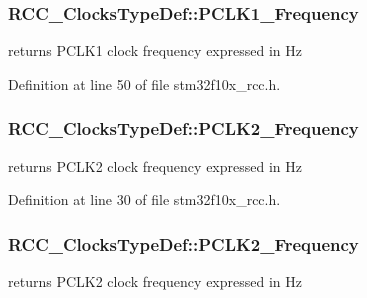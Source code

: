 \subsubsection[{\texorpdfstring{P\+C\+L\+K1\+\_\+\+Frequency}{PCLK1_Frequency}}]{ R\+C\+C\+\_\+\+Clocks\+Type\+Def\+::\+P\+C\+L\+K1\+\_\+\+Frequency}\hypertarget{struct_r_c_c___clocks_type_def_add4cfc63c35178d187107edc764e0b8f}{}\label{struct_r_c_c___clocks_type_def_add4cfc63c35178d187107edc764e0b8f}
returns P\+C\+L\+K1 clock frequency expressed in Hz 

Definition at line 50 of file stm32f10x\+\_\+rcc.\+h.

\subsubsection[{\texorpdfstring{P\+C\+L\+K2\+\_\+\+Frequency}{PCLK2_Frequency}}]{ R\+C\+C\+\_\+\+Clocks\+Type\+Def\+::\+P\+C\+L\+K2\+\_\+\+Frequency}\hypertarget{struct_r_c_c___clocks_type_def_a393ec59f4d03bc5ad678cf4f7d68b8f5}{}\label{struct_r_c_c___clocks_type_def_a393ec59f4d03bc5ad678cf4f7d68b8f5}
returns P\+C\+L\+K2 clock frequency expressed in Hz 

Definition at line 30 of file stm32f10x\+\_\+rcc.\+h.

\subsubsection[{\texorpdfstring{P\+C\+L\+K2\+\_\+\+Frequency}{PCLK2_Frequency}}]{ R\+C\+C\+\_\+\+Clocks\+Type\+Def\+::\+P\+C\+L\+K2\+\_\+\+Frequency}\hypertarget{struct_r_c_c___clocks_type_def_ad854f0b70a6c4cf6de6dbbdcbc99b856}{}\label{struct_r_c_c___clocks_type_def_ad854f0b70a6c4cf6de6dbbdcbc99b856}
returns P\+C\+L\+K2 clock frequency expressed in Hz 

